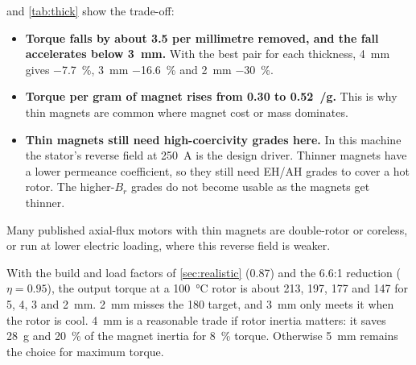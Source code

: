  and \cref{tab:thick} show the trade-off:
\begin{itemize}
\item \textbf{Torque falls by about \SI{3.5}{\Nm} per millimetre removed, and the fall accelerates below \SI{3}{mm}.} With the best pair for each thickness, \SI{4}{mm} gives \SI{-7.7}{\percent}, \SI{3}{mm} \SI{-16.6}{\percent} and \SI{2}{mm} \SI{-30}{\percent}.
\item \textbf{Torque per gram of magnet rises from 0.30 to \SI{0.52}{\Nm/g}.} This is why thin magnets are common where magnet cost or mass dominates.
\item \textbf{Thin magnets still need high-coercivity grades here.} In this machine the stator's reverse field at \SI{250}{A} is the design driver. Thinner magnets have a lower permeance coefficient, so they still need EH/AH grades to cover a hot rotor. The higher-$B_r$ grades do not become usable as the magnets get thinner.
\end{itemize}
Many published axial-flux motors with thin magnets are double-rotor or coreless, or run at lower electric loading, where this reverse field is weaker.

With the build and load factors of \cref{sec:realistic} (0.87) and the 6.6:1 reduction ($\eta=0.95$), the output torque at a \SI{100}{\celsius} rotor is about 213, 197, 177 and \SI{147}{\Nm} for 5, 4, 3 and \SI{2}{mm}. \SI{2}{mm} misses the \SI{180}{\Nm} target, and \SI{3}{mm} only meets it when the rotor is cool. \SI{4}{mm} is a reasonable trade if rotor inertia matters: it saves \SI{28}{g} and \SI{20}{\percent} of the magnet inertia for \SI{8}{\percent} torque. Otherwise \SI{5}{mm} remains the choice for maximum torque.
